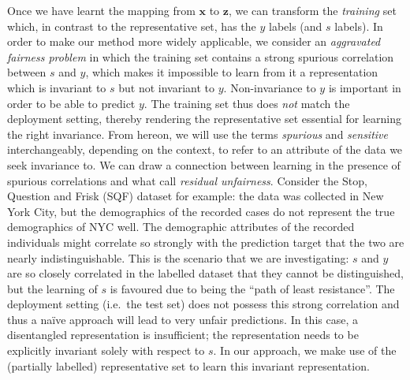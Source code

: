 Once we have learnt the mapping from $\bm{x}$ to $\bm{z}$,
we can transform the \emph{training} set which, in contrast to the representative set, has the $y$ labels (and $s$ labels).
In order to make our method more widely applicable,
we consider an \emph{aggravated fairness problem}
in which the training set contains a strong spurious correlation between $s$ and $y$,
which makes it impossible to learn from it a representation which is invariant to $s$ but not invariant to $y$.
Non-invariance to $y$ is important in order to be able to predict $y$.
The training set thus does \emph{not} match the deployment setting,
thereby rendering the representative set essential for learning the right invariance.
From hereon, we will use the terms \emph{spurious} and \emph{sensitive} interchangeably, depending on the context, to refer to an attribute of the data we seek invariance to.
We can draw a connection between learning in the presence of spurious correlations and what \citet{kallus2018residual} call \emph{residual unfairness}.
Consider the Stop, Question and Frisk (SQF) dataset for example:
the data was collected in New York City, but the demographics of the recorded cases do not represent the true demographics of NYC well.
The demographic attributes of the recorded individuals might correlate so strongly with the prediction target that the two are nearly indistinguishable.
This is the scenario that we are investigating: $s$ and $y$ are so closely correlated in the labelled dataset that they cannot be distinguished, but the learning of $s$ is favoured due to being the ``path of least resistance''.
The deployment setting (i.e.\ the test set) does not possess this strong correlation and thus a na\"ive approach will lead to very unfair predictions.
In this case, a disentangled representation is insufficient;
the representation needs to be explicitly invariant solely with respect to $s$.
In our approach, we make use of the (partially labelled) representative set to learn this invariant representation.

